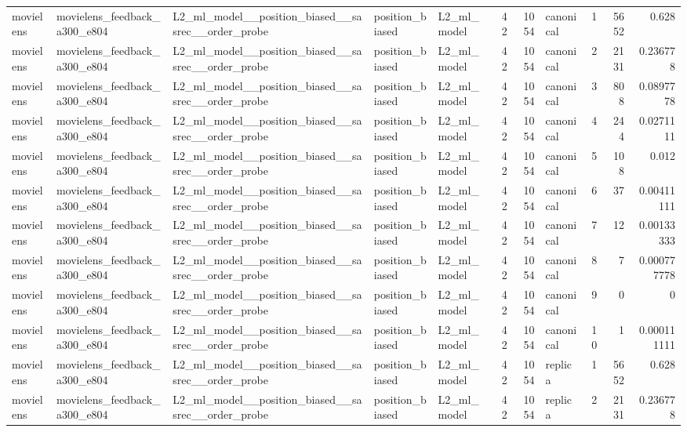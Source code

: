 \begin{table}[htbp!]
\begin{tabular}{lllllrrlrrr}
movielens & movielens\_feedback\_a300\_e804 & L2\_ml\_model\_\_position\_biased\_\_sasrec\_\_order\_probe & position\_biased & L2\_ml\_model & 42 & 1054 & canonical & 1 & 5652 & 0.628 \\
movielens & movielens\_feedback\_a300\_e804 & L2\_ml\_model\_\_position\_biased\_\_sasrec\_\_order\_probe & position\_biased & L2\_ml\_model & 42 & 1054 & canonical & 2 & 2131 & 0.236778 \\
movielens & movielens\_feedback\_a300\_e804 & L2\_ml\_model\_\_position\_biased\_\_sasrec\_\_order\_probe & position\_biased & L2\_ml\_model & 42 & 1054 & canonical & 3 & 808 & 0.0897778 \\
movielens & movielens\_feedback\_a300\_e804 & L2\_ml\_model\_\_position\_biased\_\_sasrec\_\_order\_probe & position\_biased & L2\_ml\_model & 42 & 1054 & canonical & 4 & 244 & 0.0271111 \\
movielens & movielens\_feedback\_a300\_e804 & L2\_ml\_model\_\_position\_biased\_\_sasrec\_\_order\_probe & position\_biased & L2\_ml\_model & 42 & 1054 & canonical & 5 & 108 & 0.012 \\
movielens & movielens\_feedback\_a300\_e804 & L2\_ml\_model\_\_position\_biased\_\_sasrec\_\_order\_probe & position\_biased & L2\_ml\_model & 42 & 1054 & canonical & 6 & 37 & 0.00411111 \\
movielens & movielens\_feedback\_a300\_e804 & L2\_ml\_model\_\_position\_biased\_\_sasrec\_\_order\_probe & position\_biased & L2\_ml\_model & 42 & 1054 & canonical & 7 & 12 & 0.00133333 \\
movielens & movielens\_feedback\_a300\_e804 & L2\_ml\_model\_\_position\_biased\_\_sasrec\_\_order\_probe & position\_biased & L2\_ml\_model & 42 & 1054 & canonical & 8 & 7 & 0.000777778 \\
movielens & movielens\_feedback\_a300\_e804 & L2\_ml\_model\_\_position\_biased\_\_sasrec\_\_order\_probe & position\_biased & L2\_ml\_model & 42 & 1054 & canonical & 9 & 0 & 0 \\
movielens & movielens\_feedback\_a300\_e804 & L2\_ml\_model\_\_position\_biased\_\_sasrec\_\_order\_probe & position\_biased & L2\_ml\_model & 42 & 1054 & canonical & 10 & 1 & 0.000111111 \\
movielens & movielens\_feedback\_a300\_e804 & L2\_ml\_model\_\_position\_biased\_\_sasrec\_\_order\_probe & position\_biased & L2\_ml\_model & 42 & 1054 & replica & 1 & 5652 & 0.628 \\
movielens & movielens\_feedback\_a300\_e804 & L2\_ml\_model\_\_position\_biased\_\_sasrec\_\_order\_probe & position\_biased & L2\_ml\_model & 42 & 1054 & replica & 2 & 2131 & 0.236778 \\

\end{tabular}
\end{table}
